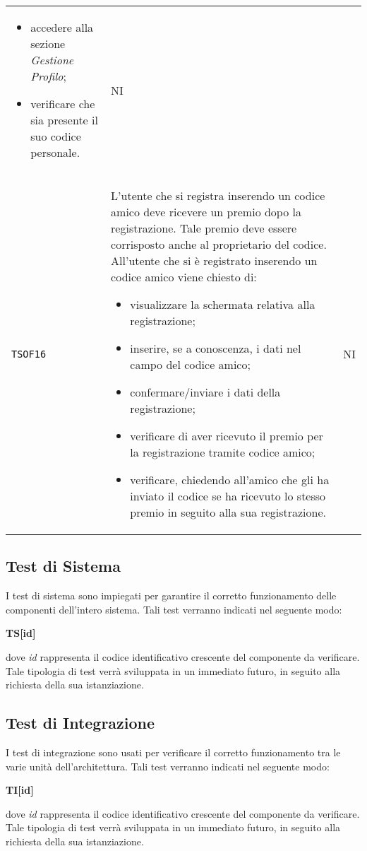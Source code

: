\begin{longtable}{ >{\centering}p{} >{\centering}p{}
			>{\centering}p{}}
		 \begin{itemize}
		 	\item accedere alla sezione \textit{Gestione Profilo};
		 	\item verificare che sia presente il suo codice personale.
		 \end{itemize}	&	NI	\tabularnewline
		 \texttt{TSOF16}	&	L'utente che si registra inserendo un codice amico deve ricevere un premio dopo la registrazione. Tale premio deve essere corrisposto anche al proprietario del codice. All'utente che si è registrato inserendo un codice amico viene chiesto di:
		 \begin{itemize}
		 	\item visualizzare la schermata relativa alla registrazione;
		 	\item inserire, se a conoscenza, i dati nel campo del codice amico;
		 	\item confermare/inviare i dati della registrazione;
		 	\item verificare di aver ricevuto il premio per la registrazione tramite codice amico;
		 	\item verificare, chiedendo all'amico che gli ha inviato il codice se ha ricevuto lo stesso premio in seguito alla sua registrazione.
		 \end{itemize}	&	NI	\tabularnewline	
	\end{longtable}

\subsection{Test di Sistema}
I test di sistema sono impiegati per garantire il corretto funzionamento delle 
componenti dell'intero sistema. Tali test verranno indicati nel seguente modo:\\
	\centerline{\textbf{TS[id]}}
dove \textit{id} rappresenta il codice identificativo crescente del componente da
verificare.\\
Tale tipologia di test verrà sviluppata in un immediato futuro, in seguito alla richiesta della sua istanziazione.


\subsection{Test di Integrazione}
I test di integrazione sono usati per verificare il corretto funzionamento tra le
varie unità dell'architettura. Tali test verranno indicati nel seguente modo:\\
	\centerline{\textbf{TI[id]}}
dove \textit{id} rappresenta il codice identificativo crescente del componente da
verificare.\\
Tale tipologia di test verrà sviluppata in un immediato futuro, in seguito alla richiesta della sua istanziazione.

